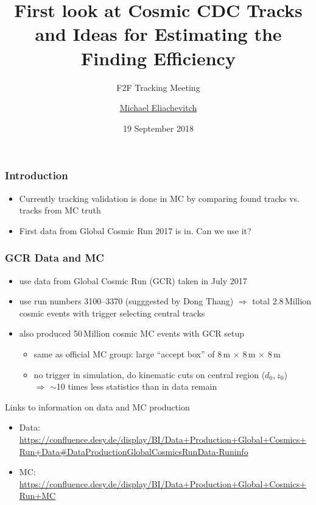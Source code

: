 \documentclass[18pt]{beamer}
\title{First look at Cosmic CDC Tracks and Ideas for Estimating the Finding Efficiency}
\subtitle{F2F Tracking Meeting}
\author{\underline{Michael Eliachevitch}}
\date{19 September 2018}
\institute{ETP - KIT}
\begin{document}

  \begin{frame}
  \titlepage
  \end{frame}

  \begin{frame}
    \frametitle{Introduction}
    \begin{itemize}
    \item Currently tracking validation is done in MC by comparing found tracks vs. tracks from MC truth
    \item First data from Global Cosmic Run 2017 is in. Can we use it? 
    \end{itemize}
  \end{frame}

  \begin{frame}
    \frametitle{GCR Data and MC}
    \begin{itemize}
    \item use data from Global Cosmic Run (GCR) taken in July 2017
    \item use run numbers 3100--3370 (sugggested by Dong Thang)
      $\Rightarrow$ total 2.8\,Million cosmic events with trigger selecting central tracks\\
    \item also produced 50\,Million cosmic MC events with GCR setup
      \begin{itemize}
      \item same as official MC group: large ``accept box'' of 8\,m $\times$ 8\,m $\times$ 8\,m 
      \item no trigger in simulation, do kinematic cuts on central region ($d_0, z_0$)\\
        $\Rightarrow$  $\sim$10 times less statistics than in data remain
      \end{itemize}
    \end{itemize}

    \begin{block}{Links to information on data and MC production}
      \begin{itemize}
      \item Data: \footnotesize{\url{https://confluence.desy.de/display/BI/Data+Production+Global+Cosmics+Run+Data\#DataProductionGlobalCosmicsRunData-Runinfo}}
      \item MC: \footnotesize{\url{https://confluence.desy.de/display/BI/Data+Production+Global+Cosmics+Run+MC}}
      \end{itemize}
    \end{block}
  \end{frame}
\end{document}
